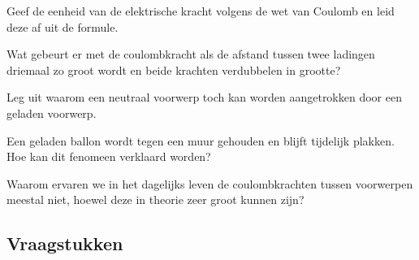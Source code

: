\begin{vraag}\label{vH1:t2}
Geef de eenheid van de elektrische kracht volgens de wet van Coulomb en leid deze af uit de formule.
\end{vraag}

\begin{vraag}\label{vH1:i2}
Wat gebeurt er met de coulombkracht als de afstand tussen twee ladingen driemaal zo groot wordt en beide krachten verdubbelen in grootte? 
\end{vraag}


\begin{vraag}\label{vH1:t aantrekken}
Leg uit waarom een neutraal voorwerp toch kan worden aangetrokken door een geladen voorwerp.
\end{vraag}

\begin{vraag}\label{vH1:ballon}
Een geladen ballon wordt tegen een muur gehouden en blijft tijdelijk plakken. Hoe kan dit fenomeen verklaard worden?
\end{vraag}

\begin{vraag}\label{vH1:dagelijksleven}
Waarom ervaren we in het dagelijks leven de coulombkrachten tussen voorwerpen meestal niet, hoewel deze in theorie zeer groot kunnen zijn?
\end{vraag}

\subsection{Vraagstukken}\label{vraagstukken:coulombkracht}%
